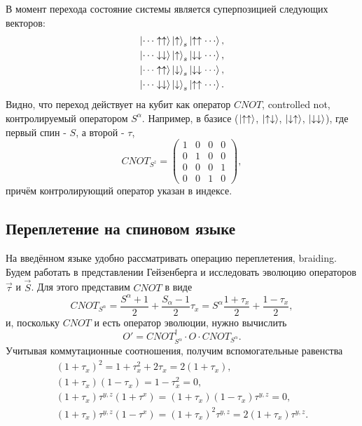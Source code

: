 \documentclass[a4paper,12pt]{article}
\theoremstyle{plain} %
\theoremstyle{definition} %
\theoremstyle{remark} %
\begin{document}
В момент перехода состояние системы является суперпозицией следующих векторов:
\begin{equation}
\begin{split}
    \ket{\dotsm \uparrow \uparrow} \ket{\uparrow}_s \ket{\uparrow \uparrow \dotsm}, \\
    \ket{\dotsm \downarrow \downarrow} \ket{\uparrow}_s \ket{\downarrow \downarrow \dotsm}, \\
    \ket{\dotsm \uparrow \uparrow} \ket{\downarrow}_s \ket{\downarrow \downarrow \dotsm}, \\
    \ket{\dotsm \downarrow \downarrow} \ket{\downarrow}_s \ket{\uparrow \uparrow \dotsm}.
\end{split}
\label{eq:transition_states}
\end{equation}
Видно, что переход действует на кубит как оператор $CNOT$, controlled not, контролируемый оператором $S^\alpha$. Например, в базисе ($\ket{\uparrow\uparrow}$, $\ket{\uparrow\downarrow}$, $\ket{\downarrow\uparrow}$, $\ket{\downarrow\downarrow}$), где первый спин - $S$, а второй - $\tau$,
\begin{equation}
CNOT_{S^z} = 
\begin{pmatrix}
    1 & 0 & 0 & 0 \\
    0 & 1 & 0 & 0 \\
    0 & 0 & 0 & 1 \\
    0 & 0 & 1 & 0
\end{pmatrix},
\end{equation}
причём контролирующий оператор указан в индексе.

\pagebreak

\subsection{Переплетение на спиновом языке} \label{sec:spin_braiding}
На введённом языке удобно рассматривать операцию переплетения, braiding. Будем работать в представлении Гейзенберга и исследовать эволюцию операторов $\vec{\tau}$ и $\vec{S}$. Для этого представим $CNOT$ в виде
\begin{equation}
    CNOT_{S^\alpha} = \frac{S^\alpha + 1}{2} + \frac{S_\alpha - 1}{2} \tau_x 
    = S^\alpha \frac{1 + \tau_x}{2} + \frac{1 - \tau_x}{2},
\end{equation}
и, поскольку $CNOT$ и есть оператор эволюции, нужно вычислить
\begin{equation}
    O' = CNOT_{S^\alpha}^\dagger \cdot O \cdot CNOT_{S^\alpha}.
    \label{eq:cnot_transformation}
\end{equation}
Учитывая коммутационные соотношения, получим вспомогательные равенства
\begin{gather}
    (1 + \tau_x)^2 = 1 + \tau_x^2 + 2 \tau_x = 2 (1 + \tau_x), \\
    (1 + \tau_x) (1 - \tau_x) = 1 - \tau_x^2 = 0, \\
    (1 + \tau_x) \tau^{y,z} (1 + \tau^x) = (1 + \tau_x) (1 - \tau_x) \tau^{y,z} = 0, \\
    (1 + \tau_x) \tau^{y,z} (1 - \tau^x) = (1 + \tau_x)^2 \tau^{y,z} = 2 (1 + \tau_x) \tau^{y,z}.
\end{gather}
\end{document}
